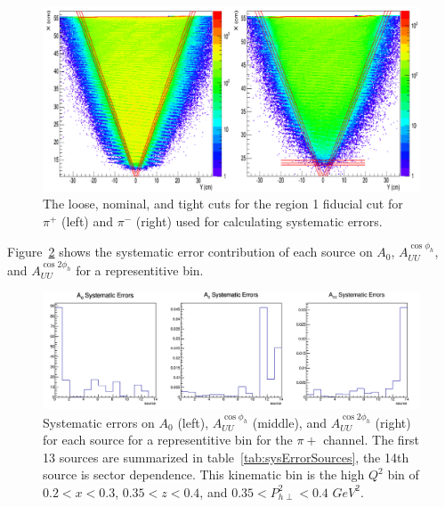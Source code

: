 %
\begin{figure}[htp]
\centering
\includegraphics[width=6in]{figures/pionSystematicCuts.png}
\caption{The loose, nominal, and tight cuts for the region 1 fiducial cut for $\pi^+$ (left) and $\pi^-$ (right) used for calculating systematic errors.}
\label{fig:pionSystematicCuts}
\end{figure}
%
Figure~\ref{fig:systematicErrors_representitiveBin} shows the systematic error contribution of each source on $A_0$, $A_{UU}^{\cos\phi_h}$, and $A_{UU}^{\cos 2\phi_h}$ for a representitive bin.
%
\begin{figure}[htp]
\centering
\includegraphics[width=6in]{figures/allSystematics_1_1_7_7.png}
\caption{Systematic errors on $A_0$ (left), $A_{UU}^{\cos\phi_h}$ (middle), and $A_{UU}^{\cos 2\phi_h}$ (right) for each source for a representitive bin for the $\pi+$ channel. The first 13 sources are summarized in table~\ref{tab:sysErrorSources}, the 14th source is sector dependence. This kinematic bin is the high $Q^2$ bin of $0.2 < x < 0.3$, $0.35 < z < 0.4$, and $0.35 < P_{h\perp}^2 < 0.4$ $GeV^2$.}
\label{fig:systematicErrors_representitiveBin}
\end{figure}
%

\clearpage
